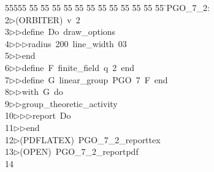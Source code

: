 %
%
\begin{tabbing}
55555 \= 55 \= 55 \= 55 \= 55 \= 55 \= 55 \= 55 \= 55 \= 55 \= 55 \= 55 \= 55 \= \>PGO\_7\_2:\\[0pt]
2\>$\triangleright$\>(ORBITER)\ v\ 2\ \\[0pt]
3\>$\triangleright$\>$\triangleright$\>define\ Do\ draw\_options\ \\[0pt]
4\>$\triangleright$\>$\triangleright$\>$\triangleright$\>radius\ 200\ line\_width\ 03\ \\[0pt]
5\>$\triangleright$\>$\triangleright$\>end\ \\[0pt]
6\>$\triangleright$\>$\triangleright$\>define\ F\ finite\_field\ q\ 2\ end\ \\[0pt]
7\>$\triangleright$\>$\triangleright$\>define\ G\ linear\_group\ PGO\ 7\ F\ end\ \\[0pt]
8\>$\triangleright$\>$\triangleright$\>with\ G\ do\ \\[0pt]
9\>$\triangleright$\>$\triangleright$\>group\_theoretic\_activity\ \\[0pt]
10\>$\triangleright$\>$\triangleright$\>$\triangleright$\>report\ Do\ \\[0pt]
11\>$\triangleright$\>$\triangleright$\>end\\[0pt]
12\>$\triangleright$\>(PDFLATEX)\ PGO\_7\_2\_reporttex\\[0pt]
13\>$\triangleright$\>(OPEN)\ PGO\_7\_2\_reportpdf\\[0pt]
14\>\end{tabbing}
